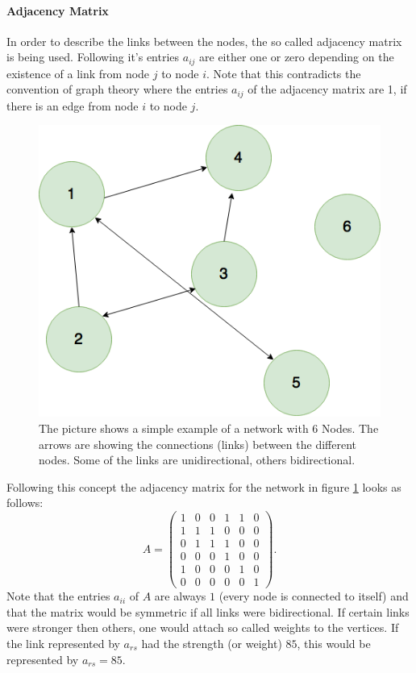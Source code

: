 \paragraph{Adjacency Matrix}
In order to describe the links between the nodes, the so called adjacency matrix is being used. Following \citep{BAR16} it's entries $a_{ij}$ are either one or zero depending on the existence of a link from node $j$ to node $i$. Note that this contradicts the convention of graph theory where the entries $a_{ij}$ of the adjacency matrix are 1, if there is an edge from node $i$ to node $j$.
\begin{figure}[htbp]
\centering
\noindent\includegraphics[width=0.4\linewidth,height=\textheight,
keepaspectratio]{Graph.png} 
\caption[Graph Example]{The picture shows  a simple example of a network with 6 Nodes. The arrows are showing the connections (links) between the different nodes. Some of the links are unidirectional, others bidirectional.}
\label{fig:simpleNetwork}
\end{figure}
Following this concept the adjacency matrix for the network in figure \ref{fig:simpleNetwork} looks as follows:
\begin{equation}
A = \left( \begin{matrix}
 1 & 0 & 0 & 1 & 1 & 0\\
 1 & 1 & 1 & 0 & 0 & 0\\
 0 & 1 & 1 & 1 & 0 & 0\\
 0 & 0 & 0 & 1 & 0 & 0\\
 1 & 0 & 0 & 0 & 1 & 0\\
 0 & 0 & 0 & 0 & 0 & 1
 \end{matrix}
 \right). \label{eq:adjMatExamp}
\end{equation}
Note that the entries $a_{ii}$ of $A$ are always $1$ (every node is connected to itself) and that the matrix would be symmetric if all links were bidirectional. 
If certain links were stronger then others, one would attach so called weights to the vertices. If the link represented by $a_{rs}$ had the strength (or weight) $85$, this would be represented by $a_{rs}= 85$. 
